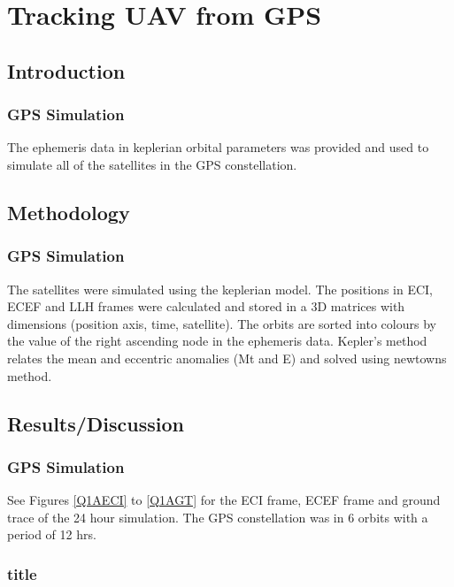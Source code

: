 \documentclass[Space3_Assign2]{subfile}
\begin{document}
\section{Tracking UAV from GPS}
\subsection{Introduction}
\subsubsection{GPS Simulation}
The ephemeris data in keplerian orbital parameters was provided and used to simulate all of the satellites in the GPS constellation.




\subsection{Methodology}
\subsubsection{GPS Simulation}
The satellites were simulated using the keplerian model. The positions in ECI, ECEF and LLH frames were calculated and stored in a 3D matrices with dimensions (position axis, time, satellite).  The orbits are sorted into colours by the value of the right ascending node in the ephemeris data. Kepler's method relates the mean and eccentric anomalies (Mt and E) and solved using newtowns method.



\subsection{Results/Discussion}
\subsubsection{GPS Simulation}
See Figures \ref{Q1AECI} to \ref{Q1AGT} for the ECI frame, ECEF frame and ground trace of the 24 hour simulation. The GPS constellation was in 6 orbits with a period of 12 hrs. 
\subsubsection{title}
\end{document}
